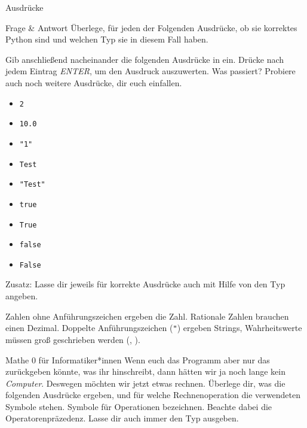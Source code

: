\begin{task}[points=auto]{Ausdrücke }
    \begin{subtask*}[points=0]{Frage \& Antwort}
        Überlege, für jeden der Folgenden Ausdrücke,
        ob sie korrektes Python sind
        und welchen Typ sie in diesem Fall haben.

        Gib anschließend nacheinander die folgenden
        Ausdrücke in  ein.
        Drücke nach jedem Eintrag \textit{ENTER},
        um den Ausdruck auszuwerten.
        Was passiert?
        Probiere auch noch weitere Ausdrücke,
        dir euch einfallen.

        \begin{multicols}{3}
            \begin{itemize}
                \item \texttt{2}
                \item \texttt{10.0}
                \item \texttt{"1"}
                \item \texttt{Test}
                \item \texttt{"Test"}
                \item \texttt{true}
                \item \texttt{True}
                \item \texttt{false}
                \item \texttt{False}
            \end{itemize}
        \end{multicols}

        Zusatz: Lasse dir jeweils für korrekte Ausdrücke auch mit Hilfe von  den Typ angeben.

        \begin{solution}
            Zahlen ohne Anführungszeichen ergeben die Zahl. Rationale Zahlen brauchen einen
            Dezimal.
            Doppelte Anführungszeichen (\texttt{"}) ergeben Strings,
            Wahrheitswerte müssen groß geschrieben werden (,
            ).
        \end{solution}
    \end{subtask*}
    \begin{subtask*}[points=0]{Mathe 0 für Informatiker*innen}
        Wenn euch das Programm aber nur das zurückgeben könnte, was ihr hinschreibt,
        dann hätten wir ja noch lange kein \textit{Computer}.
        Deswegen möchten wir jetzt etwas rechnen.
        Überlege dir, was die folgenden Ausdrücke ergeben,
        und für welche Rechnenoperation die verwendeten Symbole stehen.
        Symbole für Operationen bezeichnen.
        Beachte dabei die Operatorenpräzedenz.
        Lasse dir auch immer den Typ ausgeben.


\end{subtask*}
\end{task}
